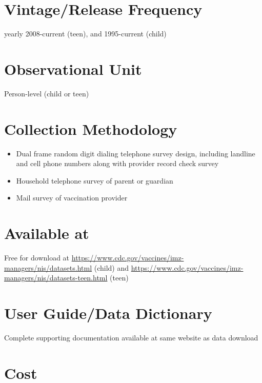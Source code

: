 \documentclass[
]{book}
\providecommand{\tightlist}{%
  \setlength{\itemsep}{0pt}\setlength{\parskip}{0pt}}
\begin{document}
\hypertarget{vintagerelease-frequency-54}{%
\section{Vintage/Release Frequency}\label{vintagerelease-frequency-54}}

yearly 2008-current (teen), and 1995-current (child)

\hypertarget{observational-unit-54}{%
\section{Observational Unit}\label{observational-unit-54}}

Person-level (child or teen)

\hypertarget{collection-methodology-54}{%
\section{Collection Methodology}\label{collection-methodology-54}}

\begin{itemize}
\tightlist
\item
  Dual frame random digit dialing telephone survey design, including landline and cell phone numbers along with provider record check survey
\item
  Household telephone survey of parent or guardian
\item
  Mail survey of vaccination provider
\end{itemize}

\hypertarget{available-at-54}{%
\section{Available at}\label{available-at-54}}

Free for download at \url{https://www.cdc.gov/vaccines/imz-managers/nis/datasets.html} (child) and \url{https://www.cdc.gov/vaccines/imz-managers/nis/datasets-teen.html} (teen)

\hypertarget{user-guidedata-dictionary-54}{%
\section{User Guide/Data Dictionary}\label{user-guidedata-dictionary-54}}

Complete supporting documentation available at same website as data download

\hypertarget{cost-54}{%
\section{Cost}\label{cost-54}}
\end{document}
